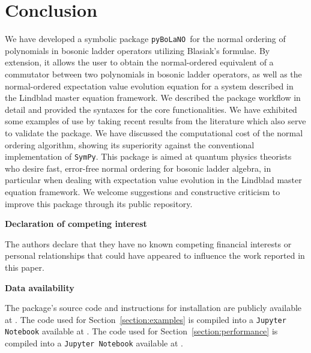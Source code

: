\documentclass[onecolumn, 12pt, sort&compress]{elsarticle}
\newcounter{bla}
\newcommand{\pybolano}{\texttt{pyBoLaNO}~}
\newenvironment{revision}{}{}
\begin{document}

\section{Conclusion}\label{section:conclusion}

We have developed a symbolic package \pybolano for the normal ordering of polynomials in bosonic ladder operators utilizing Blasiak's formulae. By extension, it allows the user to obtain the normal-ordered equivalent of a commutator between two polynomials in bosonic ladder operators, as well as the normal-ordered expectation value evolution equation for a system described in the Lindblad master equation framework. We described the package workflow in detail and provided the syntaxes for the core functionalities. We have exhibited some examples of use by taking recent results from the literature which also serve to validate the package. We have discussed the computational cost of the normal ordering algorithm, \begin{revision}showing its superiority against the conventional implementation of \texttt{SymPy}.\end{revision} This package is aimed at quantum physics theorists who desire fast, error-free normal ordering for bosonic ladder algebra, in particular when dealing with expectation value evolution in the Lindblad master equation framework. We welcome suggestions and constructive criticism to improve this package through its public repository. 


\medskip
\noindent\textbf{Declaration of competing interest}
\medskip

The authors declare that they have no known competing financial interests or personal relationships that could have appeared to influence the work reported in this paper.

\medskip
\noindent\textbf{Data availability}
\medskip

The package's source code and instructions for installation are publicly available at \href{https://github.com/hendry24/pyBoLaNO}{}. The code used for Section~\ref{section:examples} is compiled into a \texttt{Jupyter Notebook} available at \href{https://github.com/hendry24/pyBoLaNO/blob/main/tutorial.ipynb}{}. \begin{revision}The code used for Section~\ref{section:performance} is compiled into a \texttt{Jupyter Notebook} available at \href{https://github.com/hendry24/pyBoLaNO/blob/main/benchmarks.ipynb}{}.\end{revision}
\end{document}

